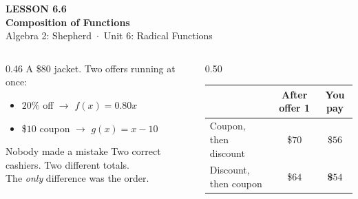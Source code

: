 \documentclass[aspectratio=169, 11pt]{beamer}
\begin{document}
{
\begin{frame}[plain]
  \vspace{2.8cm}\hspace{0.55cm}%
  \begin{minipage}{0.9\textwidth}
    {\color{goldacc}\bfseries\small LESSON 6.6}\\[0.5cm]
    {\color{white}\bfseries\LARGE Composition of Functions}\\[1.2cm]
    {\color{forestmid}\small Algebra 2: Shepherd~$\cdot$~Unit 6: Radical Functions}
  \end{minipage}
\end{frame}
}

\begin{frame}[t, plain]
  \begin{columns}[T]
    \begin{column}{0.46\textwidth}
      \footnotesize
      A \$$80$ jacket. Two offers running at once:
      \vspace{4pt}
      \begin{itemize}\setlength{\itemsep}{3pt}
        \item $20\%$ off \quad $\rightarrow$ \quad $f(x)=0.80x$
        \item \$$10$ coupon \quad $\rightarrow$ \quad $g(x)=x-10$
      \end{itemize}
      \vspace{6pt}
      \begin{block}{Nobody made a mistake}
        Two correct cashiers. Two different totals. \\[3pt]
        The \emph{only} difference was the order.
      \end{block}
    \end{column}
    \begin{column}{0.50\textwidth}
      \footnotesize
      \begin{center}
      \renewcommand{\arraystretch}{1.35}
      \begin{tabular}{|l|c|c|}
      \hline
      & \textbf{After offer 1} & \textbf{You pay} \\ \hline
      Coupon, then discount & \$$70$ & \$$56$ \\ \hline
      Discount, then coupon & \$$64$ & \textbf{\$$54$} \\ \hline
      \end{tabular}

\end{center}
\end{column}
\end{columns}
\end{frame}
\end{document}
